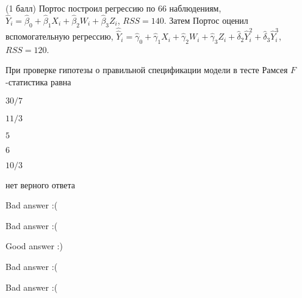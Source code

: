 
\begin{question}
(1 балл) Портос построил регрессию по 66 наблюдениям,
\(\hat Y_i = \hat\beta_0 + \hat\beta_1 X_i + \hat\beta_2 W_i + \hat\beta_3 Z_i\),
\(RSS=140\). Затем Портос оценил вспомогательную регрессию,
\(\hat{\hat {Y}}_i = \hat\gamma_0 + \hat\gamma_1 X_i + \hat\gamma_2 W_i + \hat\gamma_3 Z_i + \hat\delta_2 \hat Y_i^2 + \hat\delta_3 \hat Y_i^3\),
\(RSS=120\).

При проверке гипотезы о правильной спецификации модели в тесте Рамсея
\(F\)-статистика равна
\begin{answerlist}
  \item \(30/7\)
  \item \(11/3\)
  \item \(5\)
  \item \(6\)
  \item \(10/3\)
  \item нет верного ответа
\end{answerlist}
\end{question}

\begin{solution}
\begin{answerlist}
  \item Bad answer :(
  \item Bad answer :(
  \item Good answer :)
  \item Bad answer :(
  \item Bad answer :(
\end{answerlist}
\end{solution}
